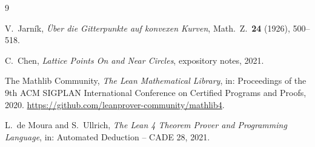 \documentclass[11pt]{amsart}
\theoremstyle{definition}
\theoremstyle{remark}
\begin{document}
\begin{thebibliography}{9}

V.\ Jarn\'{i}k, \emph{\"{U}ber die Gitterpunkte auf konvexen Kurven}, Math.\ Z.\ \textbf{24} (1926), 500--518.

C.\ Chen, \emph{Lattice Points On and Near Circles}, expository notes, 2021.

The Mathlib Community, \emph{The Lean Mathematical Library}, in: Proceedings of the 9th ACM SIGPLAN International Conference on Certified Programs and Proofs, 2020. \url{https://github.com/leanprover-community/mathlib4}.

L.\ de Moura and S.\ Ullrich, \emph{The Lean 4 Theorem Prover and Programming Language}, in: Automated Deduction -- CADE 28, 2021.

\end{thebibliography}
\end{document}
